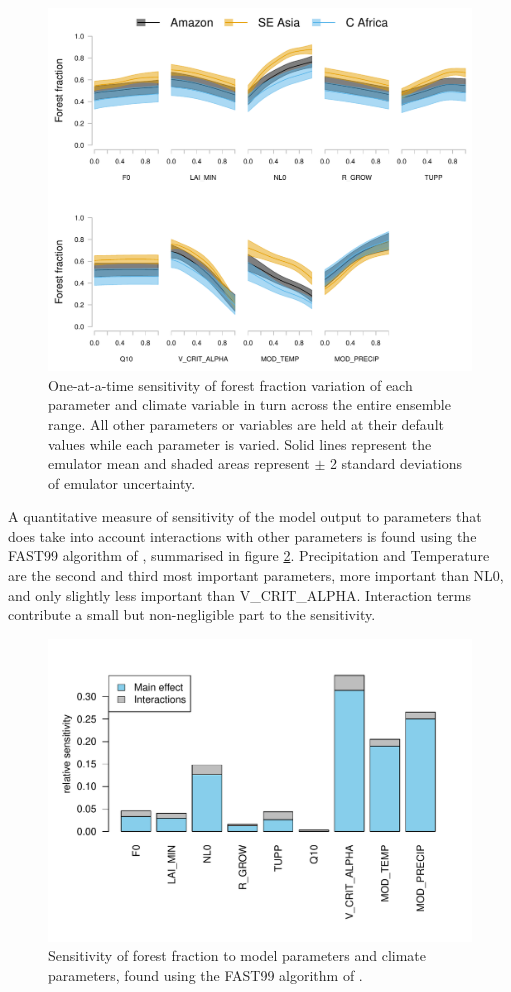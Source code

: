 \documentclass[gmd, manuscript]{copernicus}
\begin{document}
\begin{figure}[t]
\includegraphics[width=12cm]{../graphics/sensitivity_TP_all.pdf}
\caption{One-at-a-time sensitivity of forest fraction variation of each parameter and climate variable in turn across the entire ensemble range. All other parameters or variables are held at their default values while each parameter is varied. Solid lines represent the emulator mean and shaded areas represent $\pm$ 2 standard deviations of emulator uncertainty.
}
\label{fig:sensitivity_TP_all}
\end{figure}

A quantitative measure of sensitivity of the model output to parameters that does take into account interactions with other parameters is found using the FAST99 algorithm of \cite{saltelli1999sensitivity}, summarised in figure \ref{fig:fast_barplot}. Precipitation and Temperature are the second and third most important parameters, more important than NL0, and only slightly less important than V\_CRIT\_ALPHA. Interaction terms contribute a small but non-negligible part to the sensitivity.

\begin{figure}[t]
\includegraphics[width=12cm]{../graphics/fast_barplot.pdf}
\caption{Sensitivity of forest fraction to model parameters and climate parameters, found using the FAST99 algorithm of \cite{saltelli1999sensitivity}.
}
\label{fig:fast_barplot}
\end{figure}
\end{document}
